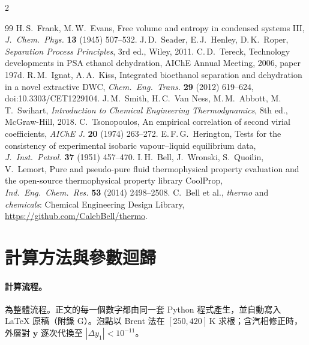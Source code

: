 \documentclass[UTF8,a4paper,11pt,fontset=none,zihao=-4]{ctexart}
\renewcommand{\thesubsection}{\arabic{section}.\arabic{subsection}}
\numberwithin{equation}{section}\renewcommand{\theequation}{\arabic{section}.\arabic{equation}}
\numberwithin{figure}{section}\renewcommand{\thefigure}{\arabic{section}.\arabic{figure}}
\numberwithin{table}{section}\renewcommand{\thetable}{\arabic{section}.\arabic{table}}
\begin{document}
\begin{multicols}{2}
\begin{thebibliography}{99}
 H.\,S.\ Frank, M.\,W.\ Evans, Free volume and entropy in condensed systems III, \textit{J.\ Chem.\ Phys.} \textbf{13} (1945) 507--532.
 J.\,D.\ Seader, E.\,J.\ Henley, D.\,K.\ Roper, \textit{Separation Process Principles}, 3rd ed., Wiley, 2011.
 C.\,D.\ Tereck, Technology developments in PSA ethanol dehydration, AIChE Annual Meeting, 2006, paper 197d.
 R.\,M.\ Ignat, A.\,A.\ Kiss, Integrated bioethanol separation and dehydration in a novel extractive DWC, \textit{Chem.\ Eng.\ Trans.} \textbf{29} (2012) 619--624, doi:10.3303/CET1229104.
 J.\,M.\ Smith, H.\,C.\ Van Ness, M.\,M.\ Abbott, M.\,T.\ Swihart, \textit{Introduction to Chemical Engineering Thermodynamics}, 8th ed., McGraw-Hill, 2018.
 C.\ Tsonopoulos, An empirical correlation of second virial coefficients, \textit{AIChE J.} \textbf{20} (1974) 263--272.
 E.\,F.\,G.\ Herington, Tests for the consistency of experimental isobaric vapour--liquid equilibrium data, \textit{J.\ Inst.\ Petrol.} \textbf{37} (1951) 457--470.
 I.\,H.\ Bell, J.\ Wronski, S.\ Quoilin, V.\ Lemort, Pure and pseudo-pure fluid thermophysical property evaluation and the open-source thermophysical property library CoolProp, \textit{Ind.\ Eng.\ Chem.\ Res.} \textbf{53} (2014) 2498--2508.
 C.\ Bell et al., \textit{thermo} and \textit{chemicals}: Chemical Engineering Design Library, \url{https://github.com/CalebBell/thermo}.
\end{thebibliography}
\end{multicols}
\label{endofmain}

\clearpage
\appendix
\renewcommand{\thefigure}{\Alph{section}.\arabic{figure}}
\renewcommand{\thetable}{\Alph{section}.\arabic{table}}
\renewcommand{\theequation}{\Alph{section}.\arabic{equation}}
\renewcommand{\thesubsection}{\Alph{section}.\arabic{subsection}}

\section{計算方法與參數迴歸}\label{app:methods}
\paragraph{計算流程。} 為整體流程。正文的每一個數字都由同一套 Python 程式產生，並自動寫入 \LaTeX{} 原稿（附錄 G）。泡點以 Brent 法在 $[250,420]$\,K 求根；含汽相修正時，外層對 $\mathbf y$ 逐次代換至 $|\Delta y_1|<10^{-11}$。
\end{document}
